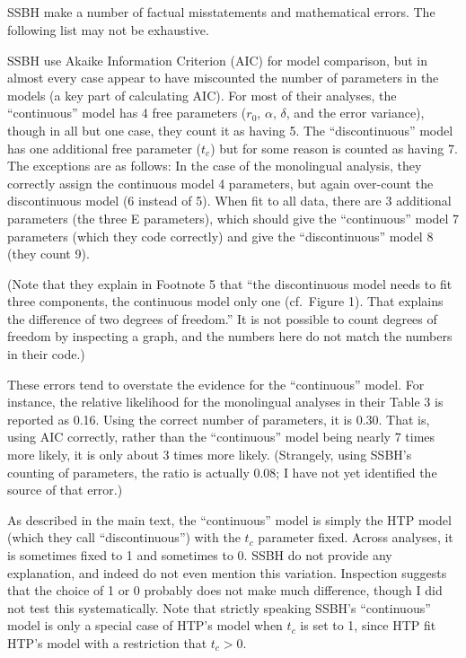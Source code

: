 \clearpage



\begin{appendix}
\section{}
SSBH make a number of factual misstatements and mathematical errors. The
following list may not be exhaustive.

SSBH use Akaike Information Criterion (AIC) for model comparison, but in
almost every case appear to have miscounted the number of parameters in
the models (a key part of calculating AIC). For most of their analyses,
the ``continuous'' model has 4 free parameters (\(r_0\), \(\alpha\),
\(\delta\), and the error variance), though in all but one case, they
count it as having 5. The ``discontinuous'' model has one additional
free parameter (\(t_c\)) but for some reason is counted as having 7. The
exceptions are as follows: In the case of the monolingual analysis, they
correctly assign the continuous model 4 parameters, but again over-count
the discontinuous model (6 instead of 5). When fit to all data, there
are 3 additional parameters (the three E parameters), which should give
the ``continuous'' model 7 parameters (which they code correctly) and
give the ``discontinuous'' model 8 (they count 9).

(Note that they explain in Footnote 5 that ``the discontinuous model
needs to fit three components, the continuous model only one (cf.~Figure
1). That explains the difference of two degrees of freedom.'' It is not
possible to count degrees of freedom by inspecting a graph, and the
numbers here do not match the numbers in their code.)

These errors tend to overstate the evidence for the ``continuous''
model. For instance, the relative likelihood for the monolingual
analyses in their Table 3 is reported as 0.16. Using the correct number
of parameters, it is 0.30. That is, using AIC correctly, rather than the
``continuous'' model being nearly 7 times more likely, it is only about
3 times more likely. (Strangely, using SSBH's counting of parameters,
the ratio is actually 0.08; I have not yet identified the source of that
error.)

As described in the main text, the ``continuous'' model is simply the
HTP model (which they call ``discontinuous'') with the \(t_c\) parameter
fixed. Across analyses, it is sometimes fixed to 1 and sometimes to 0.
SSBH do not provide any explanation, and indeed do not even mention this
variation. Inspection suggests that the choice of 1 or 0 probably does
not make much difference, though I did not test this systematically.
Note that strictly speaking SSBH's ``continuous'' model is only a
special case of HTP's model when \(t_c\) is set to 1, since HTP fit
HTP's model with a restriction that \(t_c > 0\).


\end{appendix}
